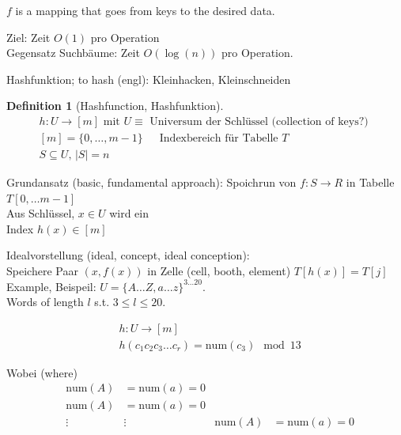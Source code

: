 \documentclass[10pt]{amsart}
\newtheorem{definition}{Definition}
\begin{document}
$f$ is a mapping that goes from keys to the desired data.

Ziel: Zeit $O(1)$ pro Operation \\

Gegensatz Suchb\"{a}ume: Zeit $O(\log{(n)})$ pro Operation.

Hashfunktion; to hash (engl): Kleinhacken, Kleinschneiden
\begin{definition}[Hashfunction, Hashfunktion]
	\begin{equation}
	\begin{gathered} 
	h: U \to [m ] \text{ mit } 
	U \equiv \text{ Universum der Schl\"{u}ssel  (collection of keys?) } \\
	[m] = \lbrace 0 , \dots , m-1 \rbrace \quad \, \text{ Indexbereich f\"{u}r Tabelle } T \\
	S \subseteq U, \, |S| = n
	\end{gathered} 
	\end{equation}
\end{definition}


Grundansatz (basic, fundamental approach): Spoichrun von $f: S \to R$ in Tabelle $T[0, \dots m-1]$ \\

Aus Schl\"{u}ssel, $x\in U$ wird ein \\
Index $h(x) \in [m]$

Idealvorstellung (ideal, concept, ideal conception): \\
Speichere Paar $(x, f(x))$ in Zelle (cell, booth, element) $T[h(x)] = T[j]$ \\

Example, Beispeil: $U = \lbrace A \dots Z, a\dots z \rbrace^{3 \dots 20}$. \\
Words of length $l$ s.t. $3\leq l \leq 20$.

\[
\begin{aligned}
& h : U \to [m] \\
& h(c_1c_2 c_3 \dots c_r) = \text{num}(c_3) \mod{ 13}
\end{aligned}
\]

Wobei (where) 
\[
\begin{aligned}
& \text{num}{(A)} &= \text{num}{(a)} = 0 \\
& \text{num}{(A)} &= \text{num}{(a)} = 0 \\
& \vdots & \vdots 
& \text{num}{(A)} &= \text{num}{(a)} = 0 
\end{aligned}
\]
\end{document}
